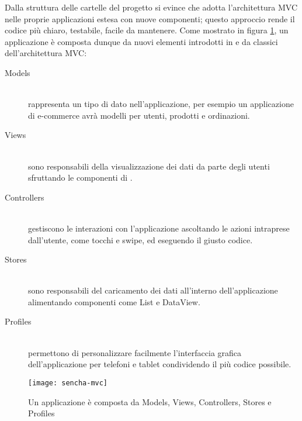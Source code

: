             Dalla struttura delle cartelle del progetto si evince che \senchat{} adotta
            l'architettura MVC nelle proprie applicazioni estesa con nuove componenti;
            questo approccio rende il codice più chiaro, testabile, facile da mantenere.
            Come mostrato in figura \ref{fig:sencha_mvc}, un applicazione è
            composta dunque da nuovi elementi introdotti in \senchat{} e da
            classici dell'architettura MVC:
            \begin{description}
                \item[Models]\hfill \\
                    rappresenta un tipo di dato nell'applicazione, per esempio un
                    applicazione di e-commerce avrà modelli per utenti, prodotti
                    e ordinazioni.
                \item[Views]\hfill \\
                    sono responsabili della visualizzazione dei dati da parte
                    degli utenti sfruttando le componenti di \senchat{}.
                \item[Controllers]\hfill \\
                    gestiscono le interazioni con l'applicazione ascoltando le
                    azioni intraprese dall'utente, come tocchi e swipe, ed eseguendo
                    il giusto codice.
                \item[Stores]\hfill \\
                    sono responsabili del caricamento dei dati all'interno
                    dell'applicazione alimentando componenti come List e DataView.
                \item[Profiles]\hfill \\
                    permettono di personalizzare facilmente l'interfaccia grafica
                    dell'applicazione per telefoni e tablet condividendo il più
                    codice possibile.
            \end{description}
            \begin{figure}[h]
                \centering
                \texttt{[image: sencha-mvc]}
                \caption{
                    Un applicazione \senchat{} è composta da Models, Views,
                    Controllers, Stores e Profiles
                }
                \label{fig:sencha_mvc}
            \end{figure}

